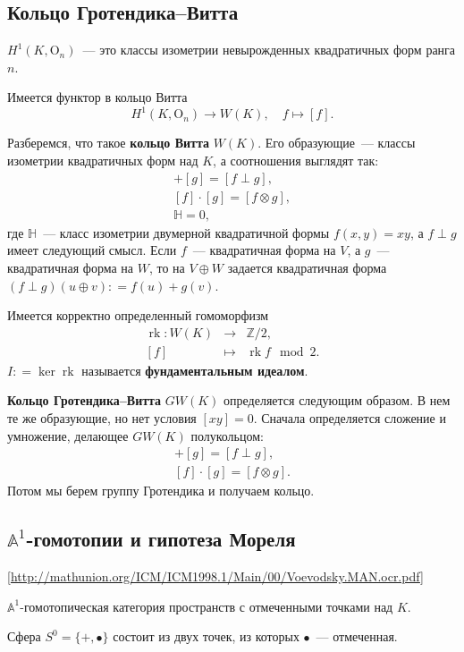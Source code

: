 \documentclass[a4paper]{article}
\DeclareMathOperator{\rk}{rk}
\renewcommand{\O}{\mathrm{O}}
\newcommand{\term}{\textbf}
\newcommand{\dfn}{\mathrel{\mathop:}=}
\theoremstyle{definition}
\begin{document}
\subsection{Кольцо Гротендика--Витта}

$H^1 (K, \O_n)$~--- это классы изометрии невырожденных квадратичных
форм ранга $n$.

Имеется функтор в кольцо Витта
\[ H^1 (K, \O_n) \to W(K), \quad f \mapsto [f]. \]

Разберемся, что такое \term{кольцо Витта} $W(K)$. Его образующие~---
классы изометрии квадратичных форм над $K$, а соотношения выглядят так:
\begin{gather*}
[f] + [g] = [f \perp g],\\
[f]\cdot [g] = [f\otimes g],\\
\mathbb{H} = 0,
\end{gather*}
где $\mathbb{H}$~--- класс изометрии двумерной квадратичной формы $f(x,y)=xy$, а
$f \perp g$ имеет следующий смысл. Если $f$~--- квадратичная форма на
$V$, а $g$~--- квадратичная форма на $W$, то на $V\oplus W$ задается
квадратичная форма $(f\perp g) (u\oplus v) \dfn f(u) + g(v)$.

Имеется корректно определенный гомоморфизм
\begin{eqnarray*}
\rk\colon W(K) & \to & \mathbb{Z}/2,\\
{}[f] & \mapsto & \rk f \mod 2.
\end{eqnarray*}
$I \dfn \ker \rk$ называется \term{фундаментальным идеалом}.

\term{Кольцо Гротендика--Витта} $GW (K)$ определяется следующим
образом. В нем те же образующие, но  нет условия $[xy] = 0$. Сначала
определяется сложение
и умножение, делающее $GW (K)$ полукольцом:
\begin{gather*}
[f] + [g] = [f \perp g],\\
[f]\cdot [g] = [f\otimes g].
\end{gather*}
Потом мы берем группу Гротендика и получаем кольцо.

\subsection{$\mathbb{A}^1$-гомотопии и гипотеза Мореля}

[\url{http://mathunion.org/ICM/ICM1998.1/Main/00/Voevodsky.MAN.ocr.pdf}]

$\mathbb{A}^1$-гомотопическая категория пространств с отмеченными
точками над $K$.

Сфера $S^0 = \{ +, \bullet \}$ состоит из двух точек, из которых
$\bullet$~--- отмеченная.
\end{document}
